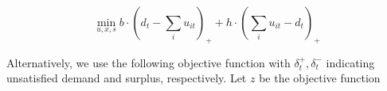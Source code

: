 \documentclass[
  a4paper,
,tablecaptionabove
]{scrartcl}
\numberwithin{equation}{section}
\begin{document}
\[\min_{u,x,s} b \cdot (d_t - \sum_i u_{it})_+ + h \cdot  ( \sum_i u_{it} - d_t)_+ \]

Alternatively, we use the following objective function with
\(\delta^+_t, \delta^-_t\) indicating unsatisfied demand and surplus,
respectively. Let \(z\) be the objective function

\end{document}
